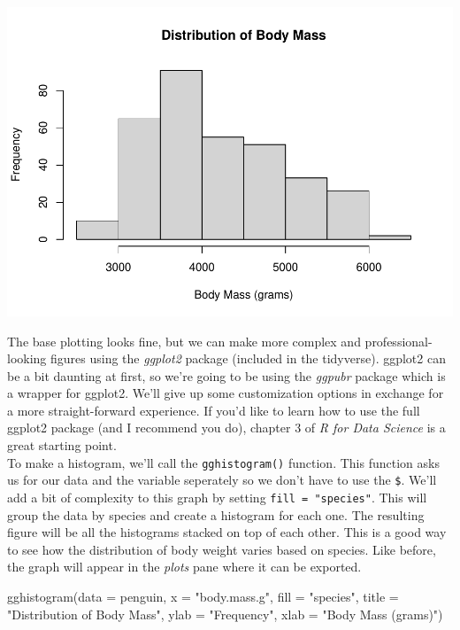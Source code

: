 \documentclass[
]{article}
\newenvironment{Shaded}{\begin{snugshade}}{\end{snugshade}}
\newcommand{\AttributeTok}[1]{\textcolor[rgb]{0.77,0.63,0.00}{#1}}
\newcommand{\FunctionTok}[1]{\textcolor[rgb]{0.00,0.00,0.00}{#1}}
\newcommand{\NormalTok}[1]{#1}
\newcommand{\StringTok}[1]{\textcolor[rgb]{0.31,0.60,0.02}{#1}}
\begin{document}
\includegraphics{Econ-Club-Example_files/figure-latex/base plotting-1.pdf}

The base plotting looks fine, but we can make more complex and
professional-looking figures using the \emph{ggplot2} package (included
in the tidyverse). ggplot2 can be a bit daunting at first, so we're
going to be using the \emph{ggpubr} package which is a wrapper for
ggplot2. We'll give up some customization options in exchange for a more
straight-forward experience. If you'd like to learn how to use the full
ggplot2 package (and I recommend you do), chapter 3 of \emph{R for Data
Science} is a great starting point.\\
\linebreak To make a histogram, we'll call the \texttt{gghistogram()}
function. This function asks us for our data and the variable seperately
so we don't have to use the \texttt{\$}. We'll add a bit of complexity
to this graph by setting \texttt{fill\ =\ "species"}. This will group
the data by species and create a histogram for each one. The resulting
figure will be all the histograms stacked on top of each other. This is
a good way to see how the distribution of body weight varies based on
species. Like before, the graph will appear in the \emph{plots} pane
where it can be exported.

\begin{Shaded}
\begin{Highlighting}[]
\FunctionTok{gghistogram}\NormalTok{(}\AttributeTok{data =}\NormalTok{ penguin, }\AttributeTok{x =} \StringTok{"body.mass.g"}\NormalTok{, }\AttributeTok{fill =} \StringTok{"species"}\NormalTok{,}
            \AttributeTok{title =} \StringTok{"Distribution of Body Mass"}\NormalTok{,}
            \AttributeTok{ylab =} \StringTok{"Frequency"}\NormalTok{,}
            \AttributeTok{xlab =} \StringTok{"Body Mass (grams)"}\NormalTok{)}
\end{Highlighting}
\end{Shaded}
\end{document}
